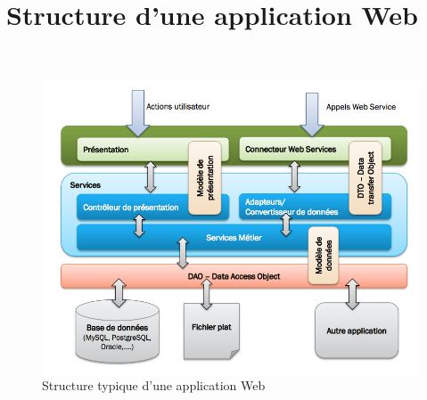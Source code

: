 \pagebreak

\section{Structure d'une application Web}\label{Annexe C}\\

\begin{figure}[!h]
\centering
\includegraphics[width=\textwidth]{images/WebAppArchitecture.png}
\caption{\label{WebAppArchitecture}Structure typique d'une application Web}
\end{figure} 

